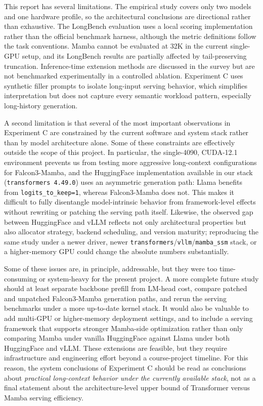 \documentclass[11pt]{article}
\begin{document}
This report has several limitations. The empirical study covers only two models and one hardware profile, so the architectural conclusions are directional rather than exhaustive. The LongBench evaluation uses a local scoring implementation rather than the official benchmark harness, although the metric definitions follow the task conventions. Mamba cannot be evaluated at 32K in the current single-GPU setup, and its LongBench results are partially affected by tail-preserving truncation. Inference-time extension methods are discussed in the survey but are not benchmarked experimentally in a controlled ablation. Experiment C uses synthetic filler prompts to isolate long-input serving behavior, which simplifies interpretation but does not capture every semantic workload pattern, especially long-history generation.

A second limitation is that several of the most important observations in Experiment C are constrained by the current software and system stack rather than by model architecture alone. Some of these constraints are effectively outside the scope of this project. In particular, the single-4090, CUDA-12.1 environment prevents us from testing more aggressive long-context configurations for Falcon3-Mamba, and the HuggingFace implementation available in our stack (\texttt{transformers 4.49.0}) uses an asymmetric generation path: Llama benefits from \texttt{logits\_to\_keep=1}, whereas Falcon3-Mamba does not. This makes it difficult to fully disentangle model-intrinsic behavior from framework-level effects without rewriting or patching the serving path itself. Likewise, the observed gap between HuggingFace and vLLM reflects not only architectural properties but also allocator strategy, backend scheduling, and version maturity; reproducing the same study under a newer driver, newer \texttt{transformers}/\texttt{vllm}/\texttt{mamba\_ssm} stack, or a higher-memory GPU could change the absolute numbers substantially.

Some of these issues are, in principle, addressable, but they were too time-consuming or system-heavy for the present project. A more complete future study should at least separate backbone prefill from LM-head cost, compare patched and unpatched Falcon3-Mamba generation paths, and rerun the serving benchmarks under a more up-to-date kernel stack. It would also be valuable to add multi-GPU or higher-memory deployment settings, and to include a serving framework that supports stronger Mamba-side optimization rather than only comparing Mamba under vanilla HuggingFace against Llama under both HuggingFace and vLLM. These extensions are feasible, but they require infrastructure and engineering effort beyond a course-project timeline. For this reason, the system conclusions of Experiment C should be read as conclusions about \emph{practical long-context behavior under the currently available stack}, not as a final statement about the architecture-level upper bound of Transformer versus Mamba serving efficiency.
\end{document}
